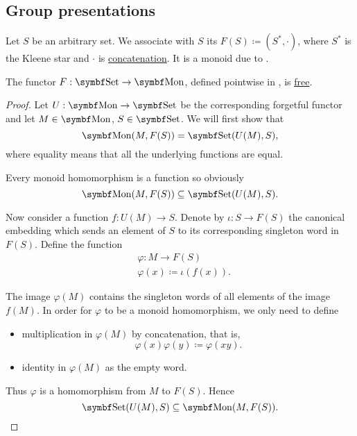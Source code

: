 \subsection{Group presentations}\label{subsec:group_presentations}

\begin{definition}\label{def:free_monoid}
  Let \( S \) be an arbitrary set. We associate with \( S \) its  \( F(S) \coloneqq (S^{*}, \cdot) \), where \( S^{*} \) is the Kleene star and \( \cdot \) is \hyperref[def:language]{concatenation}. It is a monoid due to .
\end{definition}

\begin{proposition}\label{thm:free_monoid_is_free_functor}
  The functor \( F: \Cat{Set} \to \Cat{Mon} \), defined pointwise in , is \hyperref[def:free_functor]{free}.
\end{proposition}
\begin{proof}
  Let \( U: \Cat{Mon} \to \Cat{Set} \) be the corresponding forgetful functor and let \( M \in \Cat{Mon} \), \( S \in \Cat{Set} \). We will first show that
  \begin{equation*}
    \Cat{Mon}(M, F(S)) = \Cat{Set}(U(M), S),
  \end{equation*}
  where equality means that all the underlying functions are equal.

  Every monoid homomorphism is a function so obviously
  \begin{equation*}
    \Cat{Mon}(M, F(S)) \subseteq \Cat{Set}(U(M), S).
  \end{equation*}

  Now consider a function \( f: U(M) \to S \). Denote by \( \iota: S \to F(S) \) the canonical embedding which sends an element of \( S \) to its corresponding singleton word in \( F(S) \). Define the function
  \begin{align*}
     & \varphi: M \to F(S)               \\
     & \varphi(x) \coloneqq \iota(f(x)).
  \end{align*}

  The image \( \varphi(M) \) contains the singleton words of all elements of the image \( f(M) \). In order for \( \varphi \) to be a monoid homomorphism, we only need to define
  \begin{itemize}
    \item multiplication in \( \varphi(M) \) by concatenation, that is,
          \begin{equation*}
            \varphi(x) \varphi(y) \coloneqq \varphi(xy).
          \end{equation*}

    \item identity in \( \varphi(M) \) as the empty word.
  \end{itemize}

  Thus \( \varphi \) is a homomorphism from \( M \) to \( F(S) \). Hence
  \begin{equation*}
    \Cat{Set}(U(M), S) \subseteq \Cat{Mon}(M, F(S)).
  \end{equation*}
\end{proof}

